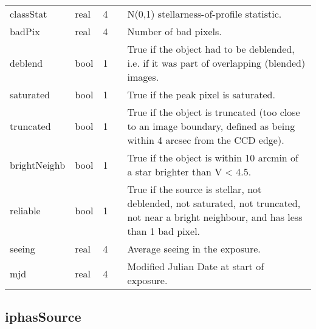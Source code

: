 \documentclass[12pt]{article}
\begin{document}
\begin{center}
\begin{longtable}{llclp{10cm}}
classStat & real & 4 & & N(0,1) stellarness-of-profile statistic. \\
badPix & real & 4 &  & Number of bad pixels. \\
deblend & bool & 1 &  & True if the object had to be deblended, i.e. if it was part of overlapping (blended) images. \\ 
saturated & bool & 1 &  & True if the peak pixel is saturated. \\ 
truncated & bool & 1 &  & True if the object is truncated (too close to an image boundary, defined as being within 4 arcsec from the CCD edge). \\ 
brightNeighb & bool & 1 &  & True if the object is within 10 arcmin of a star brighter than V < 4.5. \\ 
reliable & bool & 1 & & True if the source is stellar, not deblended, not saturated, not truncated, not near a bright neighbour, and has less than 1 bad pixel. \\

seeing & real & 4 & & Average seeing in the exposure. \\
mjd & real & 4 & & Modified Julian Date at start of exposure. \\

\end{longtable}
\end{center}

\newpage

\subsection{iphasSource}
\end{document}
